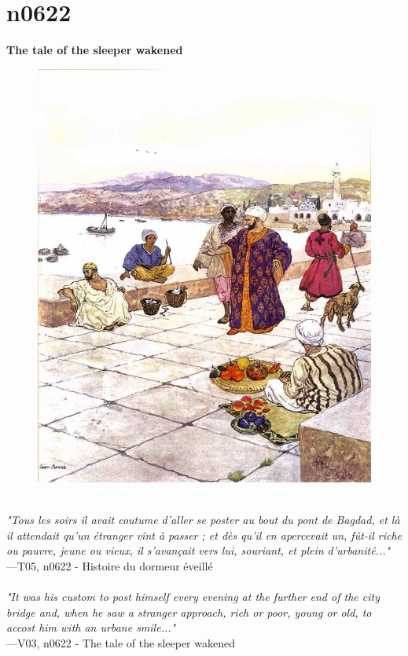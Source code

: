 \documentclass[../Carre_nights.tex]{subfiles}
\begin{document}
\newpage

\section{n0622}
\textbf{\Large{The tale of the sleeper wakened}} \\

\begin{figure}[ht]
\centering
\includegraphics[height=\figsize]{illustrations/volume_5/T05, n0622 - Histoire du dormeur éveillé.jpg}
\end{figure}

\textit{\\
"Tous les soirs il avait coutume d’aller se poster au bout du pont de Bagdad, et là il attendait qu’un étranger vînt à passer ; et dès qu’il en apercevait un, fût-il riche ou pauvre, jeune ou vieux, il s’avançait vers lui, souriant, et plein d’urbanité..."} \\
—T05, n0622 - Histoire du dormeur éveillé \\~\\
\textit{"It was his custom to post himself every evening at the further end of the city bridge and, when he saw a stranger approach, rich or poor, young or old, to accost him with an urbane smile..."} \\
—V03, n0622 - The tale of the sleeper wakened
\end{document}
